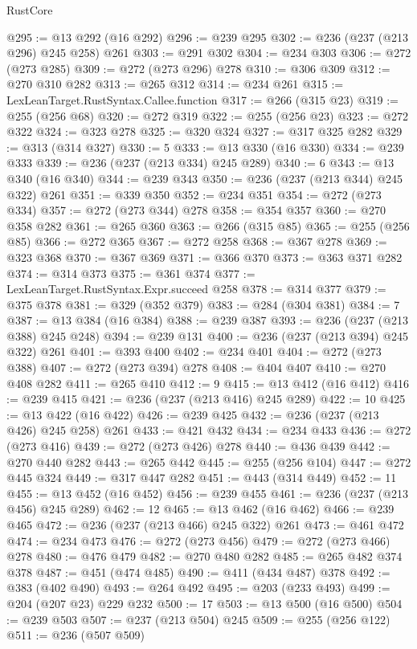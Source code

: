 \begin{lexlean}{RustCore}
\begin{coremodule}
@295 := @13 @292 (@16 @292)
@296 := @239 @295
@302 := @236 (@237 (@213 @296) @245 @258) @261
@303 := @291 @302
@304 := @234 @303
@306 := @272 (@273 @285)
@309 := @272 (@273 @296) @278
@310 := @306 @309
@312 := @270 @310 @282
@313 := @265 @312
@314 := @234 @261
@315 := LexLeanTarget.RustSyntax.Callee.function
@317 := @266 (@315 @23)
@319 := @255 (@256 @68)
@320 := @272 @319
@322 := @255 (@256 @23)
@323 := @272 @322
@324 := @323 @278
@325 := @320 @324
@327 := @317 @325 @282
@329 := @313 (@314 @327)
@330 := 5
@333 := @13 @330 (@16 @330)
@334 := @239 @333
@339 := @236 (@237 (@213 @334) @245 @289)
@340 := 6
@343 := @13 @340 (@16 @340)
@344 := @239 @343
@350 := @236 (@237 (@213 @344) @245 @322) @261
@351 := @339 @350
@352 := @234 @351
@354 := @272 (@273 @334)
@357 := @272 (@273 @344) @278
@358 := @354 @357
@360 := @270 @358 @282
@361 := @265 @360
@363 := @266 (@315 @85)
@365 := @255 (@256 @85)
@366 := @272 @365
@367 := @272 @258
@368 := @367 @278
@369 := @323 @368
@370 := @367 @369
@371 := @366 @370
@373 := @363 @371 @282
@374 := @314 @373
@375 := @361 @374
@377 := LexLeanTarget.RustSyntax.Expr.succeed @258
@378 := @314 @377
@379 := @375 @378
@381 := @329 (@352 @379)
@383 := @284 (@304 @381)
@384 := 7
@387 := @13 @384 (@16 @384)
@388 := @239 @387
@393 := @236 (@237 (@213 @388) @245 @248)
@394 := @239 @131
@400 := @236 (@237 (@213 @394) @245 @322) @261
@401 := @393 @400
@402 := @234 @401
@404 := @272 (@273 @388)
@407 := @272 (@273 @394) @278
@408 := @404 @407
@410 := @270 @408 @282
@411 := @265 @410
@412 := 9
@415 := @13 @412 (@16 @412)
@416 := @239 @415
@421 := @236 (@237 (@213 @416) @245 @289)
@422 := 10
@425 := @13 @422 (@16 @422)
@426 := @239 @425
@432 := @236 (@237 (@213 @426) @245 @258) @261
@433 := @421 @432
@434 := @234 @433
@436 := @272 (@273 @416)
@439 := @272 (@273 @426) @278
@440 := @436 @439
@442 := @270 @440 @282
@443 := @265 @442
@445 := @255 (@256 @104)
@447 := @272 @445 @324
@449 := @317 @447 @282
@451 := @443 (@314 @449)
@452 := 11
@455 := @13 @452 (@16 @452)
@456 := @239 @455
@461 := @236 (@237 (@213 @456) @245 @289)
@462 := 12
@465 := @13 @462 (@16 @462)
@466 := @239 @465
@472 := @236 (@237 (@213 @466) @245 @322) @261
@473 := @461 @472
@474 := @234 @473
@476 := @272 (@273 @456)
@479 := @272 (@273 @466) @278
@480 := @476 @479
@482 := @270 @480 @282
@485 := @265 @482 @374 @378
@487 := @451 (@474 @485)
@490 := @411 (@434 @487) @378
@492 := @383 (@402 @490)
@493 := @264 @492
@495 := @203 (@233 @493)
@499 := @204 (@207 @23) @229 @232
@500 := 17
@503 := @13 @500 (@16 @500)
@504 := @239 @503
@507 := @237 (@213 @504) @245
@509 := @255 (@256 @122)
@511 := @236 (@507 @509)

\end{coremodule}
\end{lexlean}
